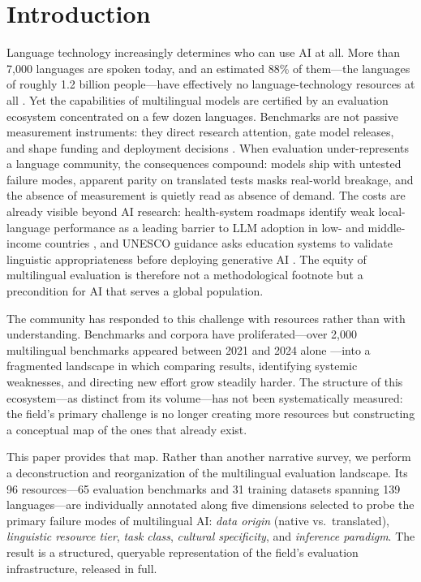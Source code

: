 \documentclass[letterpaper]{article} %
\begin{document}
\section{Introduction}
Language technology increasingly determines who can use AI at all. More than 7{,}000 languages are spoken today, and an estimated 88\% of them---the languages of roughly 1.2 billion people---have effectively no language-technology resources at all \cite{joshi2020state}. Yet the capabilities of multilingual models are certified by an evaluation ecosystem concentrated on a few dozen languages. Benchmarks are not passive measurement instruments: they direct research attention, gate model releases, and shape funding and deployment decisions \cite{blodgett-etal-2020-language,raji2021ai}. When evaluation under-represents a language community, the consequences compound: models ship with untested failure modes, apparent parity on translated tests masks real-world breakage, and the absence of measurement is quietly read as absence of demand. The costs are already visible beyond AI research: health-system roadmaps identify weak local-language performance as a leading barrier to LLM adoption in low- and middle-income countries \cite{chen2025llmglobalhealth}, and UNESCO guidance asks education systems to validate linguistic appropriateness before deploying generative AI \cite{miao2023guidance}. The equity of multilingual evaluation is therefore not a methodological footnote but a precondition for AI that serves a global population.
 
The community has responded to this challenge with resources rather than with understanding. Benchmarks and corpora have proliferated---over 2{,}000 multilingual benchmarks appeared between 2021 and 2024 alone \cite{wu2025bitter}---into a fragmented landscape in which comparing results, identifying systemic weaknesses, and directing new effort grow steadily harder. The structure of this ecosystem---as distinct from its volume---has not been systematically measured: the field's primary challenge is no longer creating more resources but constructing a conceptual map of the ones that already exist.
 
This paper provides that map. Rather than another narrative survey, we perform a deconstruction and reorganization of the multilingual evaluation landscape. Its 96 resources---65 evaluation benchmarks and 31 training datasets spanning 139 languages---are individually annotated along five dimensions selected to probe the primary failure modes of multilingual AI: \emph{data origin} (native vs.\ translated), \emph{linguistic resource tier}, \emph{task class}, \emph{cultural specificity}, and \emph{inference paradigm}. The result is a structured, queryable representation of the field's evaluation infrastructure, released in full.
 
\end{document}
